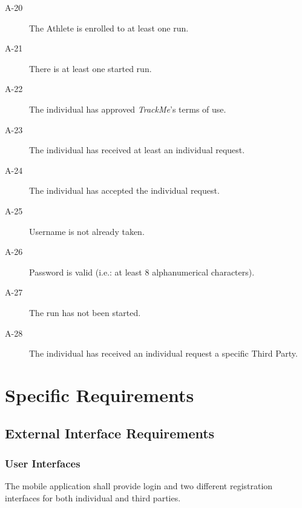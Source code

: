 \documentclass[a4paper]{article}
\begin{document}
\begin{description}
        \item[A-20] The Athlete is enrolled to at least one run.
        \item[A-21] There is at least one started run.
        \item[A-22] The individual has approved \textit{TrackMe}'s terms of use.
        \item[A-23] The individual has received at least an individual request.
        \item[A-24] The individual has accepted the individual request.
        \item[A-25] Username is not already taken.
        \item[A-26] Password is valid (i.e.: at least 8 alphanumerical characters).
        \item[A-27] The run has not been started.
        \item[A-28] The individual has received an individual request a specific Third Party.
        \end{description}
        
\newpage
\section{Specific Requirements}

    \subsection{External Interface Requirements}
        
        \subsubsection{User Interfaces}
        
        The mobile application shall provide login and two different registration interfaces for both individual and third parties.
        
\end{document}

